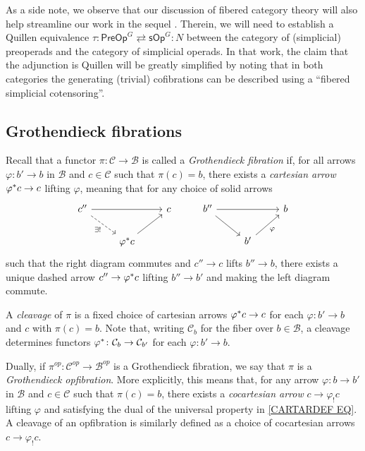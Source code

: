 \documentclass[a4paper,10pt
,draft
]{article}%
\numberwithin{equation}{section}
\numberwithin{figure}{section}
\theoremstyle{definition} %
\newcommand{\1}{\ensuremath{\mathbbm 1}}%
\begin{document}
As a side note, we observe that our discussion of fibered category theory will
also help streamline our work in the sequel \cite{BP_TAS}.
Therein, we will need to establish a Quillen equivalence
$\tau \colon \mathsf{PreOp}^G \rightleftarrows \mathsf{sOp}^G\colon N$
between the category of (simplicial) preoperads and
the category of simplicial operads.
In that work, the claim that the adjunction is Quillen 
will be greatly simplified by noting that in both categories 
the generating (trivial) cofibrations
can be described using a ``fibered simplicial cotensoring''.





\subsection{Grothendieck fibrations}\label{GROTFIB SEC}


Recall that a functor 
$\pi \colon \mathcal{C} \to \mathcal{B}$
is called a \emph{Grothendieck fibration} if,
for all arrows
$\varphi \colon b' \to b$ in $\mathcal{B}$
and $c \in \mathcal{C}$ such that $\pi(c) = b$,
there exists a \emph{cartesian arrow}
$\varphi^{\**}c \to c$
lifting $\varphi$,
meaning that for any choice of solid arrows
\begin{equation}\label{CARTARDEF EQ}
\begin{tikzcd}
	c'' \ar{rr} \ar[dashed]{rd}[swap]{\exists!} 
&&
	c
&%
	b'' \ar{rr} \ar{rd} 
&&
	b
\\
	& \varphi^{\**} c \ar{ru}
&
&%
	& b'\ar{ru}[swap]{\varphi}
&
\end{tikzcd}
\end{equation}
such that the right diagram commutes and 
$c'' \to c$ lifts $b'' \to b$,
there exists a unique dashed arrow
$c'' \to \varphi^{\**} c$ lifting $b'' \to b'$
and making the left diagram commute.


A \emph{cleavage} of $\pi$ is a fixed choice of cartesian arrows
$\varphi^{\**} c \to c$
for each $\varphi \colon b' \to b$ and $c$ with $\pi(c)=b$.
%
Note that, writing $\mathcal{C}_b$ for the fiber over $b \in \mathcal{B}$, a cleavage determines functors
$\varphi^{\**} \colon \mathcal{C}_b \to \mathcal{C}_{b'}$
for each $\varphi \colon b' \to b$.


Dually, if $\pi^{op} \colon \mathcal{C}^{op} \to \mathcal{B}^{op}$
is a Grothendieck fibration,
we say that $\pi$ is a \emph{Grothendieck opfibration}.
More explicitly, this means that, for any arrow
$\varphi \colon b \to b'$ in $\mathcal{B}$
and $c \in \mathcal{C}$ such that $\pi(c) = b$,
there exists a \emph{cocartesian arrow}
$c \to \varphi_! c$ lifting $\varphi$
and satisfying the dual of the universal property in 
\eqref{CARTARDEF EQ}.
A cleavage of an opfibration is similarly defined as a 
choice of cocartesian arrows $c \to \varphi_!c$.
\end{document}
